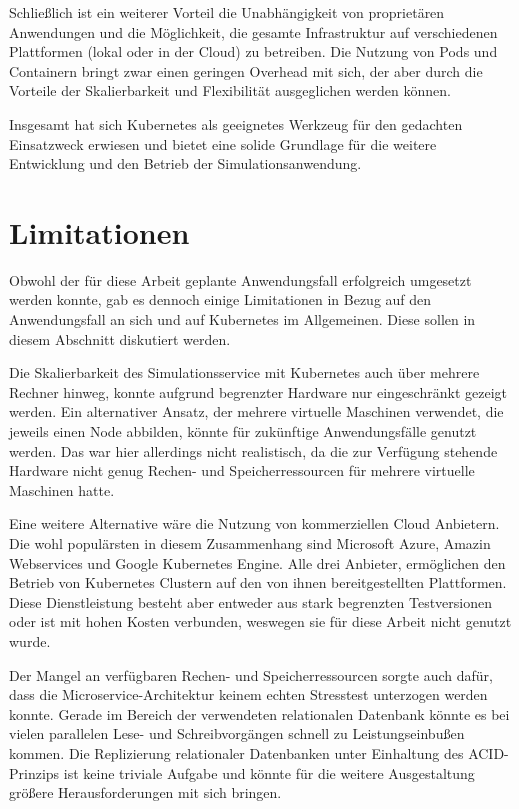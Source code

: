 \documentclass[11pt,a4paper]{article}
\begin{document}
Schließlich ist ein weiterer Vorteil die Unabhängigkeit von proprietären Anwendungen und die Möglichkeit, 
die gesamte Infrastruktur auf verschiedenen Plattformen (lokal oder in der Cloud) zu betreiben. 
Die Nutzung von Pods und Containern bringt zwar einen geringen Overhead mit sich,
der aber durch die Vorteile der Skalierbarkeit und Flexibilität ausgeglichen werden können.

Insgesamt hat sich Kubernetes als geeignetes Werkzeug für den gedachten Einsatzweck erwiesen 
und bietet eine solide Grundlage für die weitere Entwicklung und den Betrieb der Simulationsanwendung.


\section{Limitationen}
Obwohl der für diese Arbeit geplante Anwendungsfall erfolgreich umgesetzt werden konnte,
gab es dennoch einige Limitationen in Bezug auf den Anwendungsfall an sich und auf
Kubernetes im Allgemeinen. Diese sollen in diesem Abschnitt diskutiert werden.

Die Skalierbarkeit des Simulationsservice mit Kubernetes auch über mehrere Rechner hinweg,
konnte aufgrund begrenzter Hardware nur eingeschränkt gezeigt werden. Ein alternativer Ansatz,
der mehrere virtuelle Maschinen verwendet, die jeweils einen Node abbilden, könnte 
für zukünftige Anwendungsfälle genutzt werden. Das war hier allerdings nicht realistisch,
da die zur Verfügung stehende Hardware nicht genug Rechen- und Speicherressourcen
für mehrere virtuelle Maschinen hatte.

Eine weitere Alternative wäre die Nutzung von kommerziellen Cloud Anbietern.
Die wohl populärsten in diesem Zusammenhang sind Microsoft Azure,
Amazin Webservices und Google Kubernetes Engine. Alle drei Anbieter,
ermöglichen den Betrieb von Kubernetes Clustern auf den von 
ihnen bereitgestellten Plattformen. Diese Dienstleistung
besteht aber entweder aus stark begrenzten Testversionen oder
ist mit hohen Kosten verbunden, weswegen sie für diese Arbeit nicht genutzt wurde.

Der Mangel an verfügbaren Rechen- und Speicherressourcen sorgte auch dafür,
dass die Microservice-Architektur keinem echten Stresstest unterzogen werden konnte.
Gerade im Bereich der verwendeten relationalen Datenbank könnte es bei vielen
parallelen Lese- und Schreibvorgängen schnell zu Leistungseinbußen kommen.
Die Replizierung relationaler Datenbanken unter Einhaltung des ACID-Prinzips
ist keine triviale Aufgabe und könnte für die weitere Ausgestaltung 
größere Herausforderungen mit sich bringen.
\end{document}
